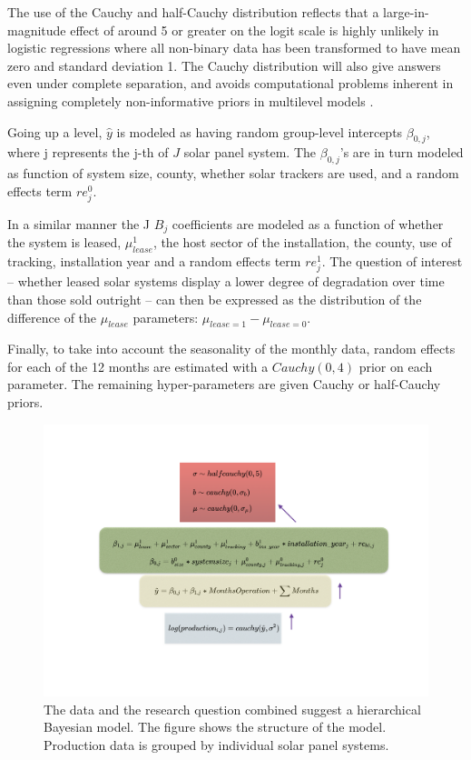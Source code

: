 \documentclass[12pt]{article}
\begin{document}
The use of the Cauchy and half-Cauchy distribution reflects that a large-in-magnitude effect of around 5 or greater on the logit scale is highly unlikely in logistic regressions where all non-binary data has been transformed to have mean zero and standard deviation 1. The Cauchy distribution will also give answers even under complete separation, and avoids computational problems inherent in assigning completely non-informative priors in multilevel models \citep{gelman_weakly_2008}.

Going up a level, $\hat{y}$ is modeled as having random group-level intercepts $\beta_{0,j}$, where j represents the j-th of $J$ solar panel system. The $\beta_{0,j}$'s are in turn modeled as function of system size, county, whether solar trackers are used, and a random effects term $re_j^0$. 

In a similar manner the J $B_j$ coefficients are modeled as a function of whether the system is leased, $\mu_{lease}^1$, the host sector of the installation, the county, use of tracking, installation year and a random effects term $re^1_j$.  The question of interest -- whether leased solar systems display a lower degree of degradation over time than those sold outright -- can then be expressed as the distribution of the difference of the $\mu_{lease}$ parameters: $\mu_{lease=1} - \mu_{lease=0}$.

Finally, to take into account the seasonality of the monthly data, random effects for each of the 12 months are estimated with a $Cauchy(0,4)$ prior on each parameter. The remaining hyper-parameters are given Cauchy or half-Cauchy priors. 

\begin{figure}
	\includegraphics[width=1\textwidth]{figures/solar_prod_bayes_diag.png}
	\caption{The data and the research question combined suggest a hierarchical Bayesian model. The figure shows the structure of the model. Production data is grouped by individual solar panel systems.}
	\label{solar_prod_bayes_diag}
\end{figure}
\end{document}
